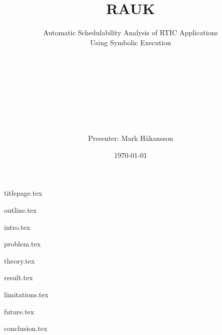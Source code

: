 \documentclass[10pt]{beamer}
\title[RAUK]{
    \hspace{1cm} \\
    \Huge RAUK}
\subtitle{
    Automatic Schedulability Analysis of RTIC Applications \\
    Using Symbolic Execution}
\author{
    \hspace{1cm} \\
    \hspace{1cm} \\
    \hspace{1cm} \\
    \hspace{1cm} \\
    \hspace{1cm} \\
    \hspace{1cm} \\
    \hspace{1cm} \\
    \hspace{1cm} \\
    Presenter: Mark Håkansson}
\institute{
    \hspace{1cm} \\
    Supervisor: Prof. Per Lindgren \\
    Luleå University of Technology}
\date{\today}
\begin{document}
{titlepage.tex}

{outline.tex}

{intro.tex}

{problem.tex}

{theory.tex}

{result.tex}

{limitations.tex}

{future.tex}

{conclusion.tex}
\end{document}
